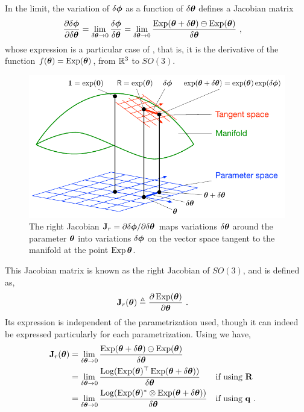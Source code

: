 In the limit, the variation of $\delta{\bm \phi}$ as a function of $\delta{\bm \theta}$ defines a Jacobian matrix
%
\begin{align}
\frac{\partial\delta{\bm \phi}}{\partial\delta{\bm \theta}} 
&= \lim_{\delta{\bm \theta}\to0}\frac{\delta{\bm \phi}}{\delta{\bm \theta}} 
= \lim_{\delta{\bm \theta}\to0}\frac{\operatorname*{Exp}({\bm \theta}+\delta{\bm \theta}) \ominus \operatorname*{Exp}({\bm \theta})}{\delta{\bm \theta}} 
~,
\end{align}
%
whose expression is a particular case of , that is, it is the derivative of the function $f({\bm \theta})=\operatorname*{Exp}({\bm \theta})$, from ${\mathbb R}^3$ to $SO(3)$.
%
\begin{figure}[tbp]
\begin{center}
\includegraphics{figures/right_jac}
\caption{The right Jacobian ${\bf J}_r=\partial\delta{\bm \phi}/\partial\delta{\bm \theta}$ maps variations $\delta{\bm \theta}$ around the parameter ${\bm \theta}$ into variations $\delta{\bm \phi}$ on the vector space tangent to the manifold at the point $\operatorname*{Exp}{{\bm \theta}}$. }
\label{fig:right_jac}
\end{center}
\end{figure}
%
This Jacobian matrix is known as the right Jacobian of $SO(3)$, and is defined as,
%
\begin{align}
{\bf J}_r({\bm \theta}) &\triangleq \frac{\partial\operatorname*{Exp}({\bm \theta})}{\partial{\bm \theta}} 
~.
\end{align}
%
Its expression is independent of the parametrization used, though it can indeed be expressed particularly for each parametrization. Using  we have,
%
\begin{align}
{\bf J}_r({\bm \theta}) &= \lim_{\delta{\bm \theta}\to0}\frac{\operatorname*{Exp}({\bm \theta}+\delta{\bm \theta})\ominus\operatorname*{Exp}({\bm \theta})}{\delta{\bm \theta}} \\
 &= \lim_{\delta{\bm \theta}\to0}\frac{\operatorname*{Log}(\operatorname*{Exp}({\bm \theta})^{\top}\operatorname*{Exp}({\bm \theta}+\delta{\bm \theta}))}{\delta{\bm \theta}} && \textrm{if using ${\bf R}$} \\
 &= \lim_{\delta{\bm \theta}\to0}\frac{\operatorname*{Log}(\operatorname*{Exp}({\bm \theta})^*\otimes\operatorname*{Exp}({\bm \theta}+\delta{\bm \theta}))}{\delta{\bm \theta}} && \textrm{if using ${\bf q}$} 
 ~.
\end{align}
%

